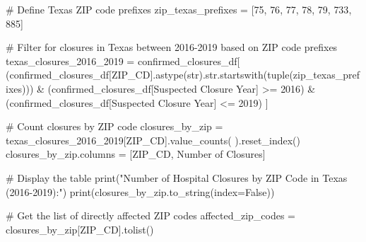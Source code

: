 \documentclass[
  letterpaper,
  DIV=11,
  numbers=noendperiod]{scrartcl}
\newenvironment{Shaded}{\begin{snugshade}}{\end{snugshade}}
\newcommand{\BuiltInTok}[1]{\textcolor[rgb]{0.00,0.23,0.31}{#1}}
\newcommand{\CommentTok}[1]{\textcolor[rgb]{0.37,0.37,0.37}{#1}}
\newcommand{\DecValTok}[1]{\textcolor[rgb]{0.68,0.00,0.00}{#1}}
\newcommand{\NormalTok}[1]{\textcolor[rgb]{0.00,0.23,0.31}{#1}}
\newcommand{\OperatorTok}[1]{\textcolor[rgb]{0.37,0.37,0.37}{#1}}
\newcommand{\StringTok}[1]{\textcolor[rgb]{0.13,0.47,0.30}{#1}}
\newcommand{\VariableTok}[1]{\textcolor[rgb]{0.07,0.07,0.07}{#1}}
\begin{document}
\begin{Shaded}
\begin{Highlighting}[]
\CommentTok{\# Define Texas ZIP code prefixes}
\NormalTok{zip\_texas\_prefixes }\OperatorTok{=}\NormalTok{ [}\StringTok{\textquotesingle{}75\textquotesingle{}}\NormalTok{, }\StringTok{\textquotesingle{}76\textquotesingle{}}\NormalTok{, }\StringTok{\textquotesingle{}77\textquotesingle{}}\NormalTok{, }\StringTok{\textquotesingle{}78\textquotesingle{}}\NormalTok{, }\StringTok{\textquotesingle{}79\textquotesingle{}}\NormalTok{, }\StringTok{\textquotesingle{}733\textquotesingle{}}\NormalTok{, }\StringTok{\textquotesingle{}885\textquotesingle{}}\NormalTok{]}

\CommentTok{\# Filter for closures in Texas between 2016{-}2019 based on ZIP code prefixes}
\NormalTok{texas\_closures\_2016\_2019 }\OperatorTok{=}\NormalTok{ confirmed\_closures\_df[}
\NormalTok{    (confirmed\_closures\_df[}\StringTok{\textquotesingle{}ZIP\_CD\textquotesingle{}}\NormalTok{].astype(}\BuiltInTok{str}\NormalTok{).}\BuiltInTok{str}\NormalTok{.startswith(}\BuiltInTok{tuple}\NormalTok{(zip\_texas\_prefixes))) }\OperatorTok{\&}
\NormalTok{    (confirmed\_closures\_df[}\StringTok{\textquotesingle{}Suspected Closure Year\textquotesingle{}}\NormalTok{] }\OperatorTok{\textgreater{}=} \DecValTok{2016}\NormalTok{) }\OperatorTok{\&}
\NormalTok{    (confirmed\_closures\_df[}\StringTok{\textquotesingle{}Suspected Closure Year\textquotesingle{}}\NormalTok{] }\OperatorTok{\textless{}=} \DecValTok{2019}\NormalTok{)}
\NormalTok{]}

\CommentTok{\# Count closures by ZIP code}
\NormalTok{closures\_by\_zip }\OperatorTok{=}\NormalTok{ texas\_closures\_2016\_2019[}\StringTok{\textquotesingle{}ZIP\_CD\textquotesingle{}}\NormalTok{].value\_counts(}
\NormalTok{).reset\_index()}
\NormalTok{closures\_by\_zip.columns }\OperatorTok{=}\NormalTok{ [}\StringTok{\textquotesingle{}ZIP\_CD\textquotesingle{}}\NormalTok{, }\StringTok{\textquotesingle{}Number of Closures\textquotesingle{}}\NormalTok{]}

\CommentTok{\# Display the table}
\BuiltInTok{print}\NormalTok{(}\StringTok{"Number of Hospital Closures by ZIP Code in Texas (2016{-}2019):"}\NormalTok{)}
\BuiltInTok{print}\NormalTok{(closures\_by\_zip.to\_string(index}\OperatorTok{=}\VariableTok{False}\NormalTok{))}

\CommentTok{\# Get the list of directly affected ZIP codes}
\NormalTok{affected\_zip\_codes }\OperatorTok{=}\NormalTok{ closures\_by\_zip[}\StringTok{\textquotesingle{}ZIP\_CD\textquotesingle{}}\NormalTok{].tolist()}


\end{Highlighting}
\end{Shaded}
\end{document}
